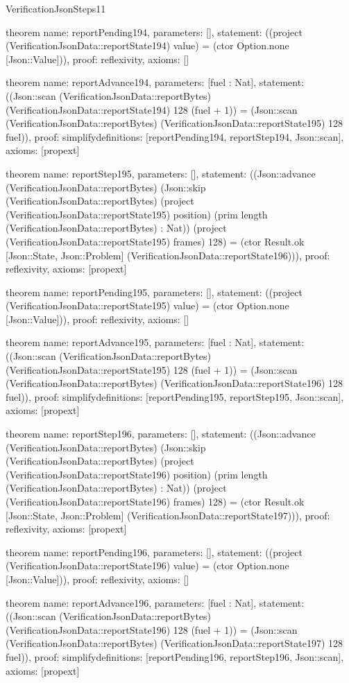 \begin{lexlean}{VerificationJsonSteps11}
\begin{semanticmodule}
theorem{
  name: reportPending194,
  parameters: [],
  statement: ((project (VerificationJsonData::reportState194) value) = (ctor Option.none [Json::Value])),
  proof: reflexivity{},
  axioms: []
}

theorem{
  name: reportAdvance194,
  parameters: [fuel : Nat],
  statement: ((Json::scan (VerificationJsonData::reportBytes) (VerificationJsonData::reportState194) 128 (fuel + 1)) = (Json::scan (VerificationJsonData::reportBytes) (VerificationJsonData::reportState195) 128 fuel)),
  proof: simplify{definitions: [reportPending194, reportStep194, Json::scan]},
  axioms: [propext]
}

theorem{
  name: reportStep195,
  parameters: [],
  statement: ((Json::advance (VerificationJsonData::reportBytes) (Json::skip (VerificationJsonData::reportBytes) (project (VerificationJsonData::reportState195) position) (prim length (VerificationJsonData::reportBytes) : Nat)) (project (VerificationJsonData::reportState195) frames) 128) = (ctor Result.ok [Json::State, Json::Problem] (VerificationJsonData::reportState196))),
  proof: reflexivity{},
  axioms: [propext]
}

theorem{
  name: reportPending195,
  parameters: [],
  statement: ((project (VerificationJsonData::reportState195) value) = (ctor Option.none [Json::Value])),
  proof: reflexivity{},
  axioms: []
}

theorem{
  name: reportAdvance195,
  parameters: [fuel : Nat],
  statement: ((Json::scan (VerificationJsonData::reportBytes) (VerificationJsonData::reportState195) 128 (fuel + 1)) = (Json::scan (VerificationJsonData::reportBytes) (VerificationJsonData::reportState196) 128 fuel)),
  proof: simplify{definitions: [reportPending195, reportStep195, Json::scan]},
  axioms: [propext]
}

theorem{
  name: reportStep196,
  parameters: [],
  statement: ((Json::advance (VerificationJsonData::reportBytes) (Json::skip (VerificationJsonData::reportBytes) (project (VerificationJsonData::reportState196) position) (prim length (VerificationJsonData::reportBytes) : Nat)) (project (VerificationJsonData::reportState196) frames) 128) = (ctor Result.ok [Json::State, Json::Problem] (VerificationJsonData::reportState197))),
  proof: reflexivity{},
  axioms: [propext]
}

theorem{
  name: reportPending196,
  parameters: [],
  statement: ((project (VerificationJsonData::reportState196) value) = (ctor Option.none [Json::Value])),
  proof: reflexivity{},
  axioms: []
}

theorem{
  name: reportAdvance196,
  parameters: [fuel : Nat],
  statement: ((Json::scan (VerificationJsonData::reportBytes) (VerificationJsonData::reportState196) 128 (fuel + 1)) = (Json::scan (VerificationJsonData::reportBytes) (VerificationJsonData::reportState197) 128 fuel)),
  proof: simplify{definitions: [reportPending196, reportStep196, Json::scan]},
  axioms: [propext]
}


\end{semanticmodule}
\end{lexlean}
